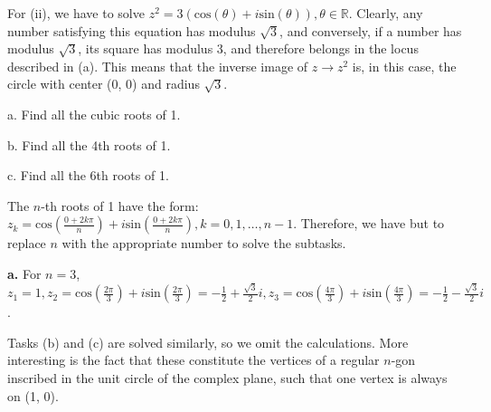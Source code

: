 \begin{solution}
    For (ii), we have to solve $z^2 = 3(\text{cos}(\theta) + i \text{sin}(\theta)), \theta \in \mathbb{R}$. Clearly, any number satisfying this equation has modulus $\sqrt{3}$, and conversely, if a number has modulus $\sqrt{3}$, its square has modulus 3, and therefore belongs in the locus described in (a). This means that the inverse image of $z \rightarrow z^2$ is, in this case, the circle with center (0, 0) and radius $\sqrt{3}$.
\end{solution}

\begin{exercise}{13}
    a. Find all the cubic roots of 1.

    b. Find all the 4th roots of 1.

    c. Find all the 6th roots of 1.
\end{exercise}

\begin{solution}

    The $n$-th roots of 1 have the form: $z_k = \text{cos}(\frac{0 + 2k\pi}{n}) + i\text{sin}(\frac{0 + 2k\pi}{n}), k = 0, 1, \ldots, n-1$. Therefore, we have but to replace $n$ with the appropriate number to solve the subtasks.

    \textbf{a.} For $n=3$, $z_1 = 1, z_2 = \text{cos}(\frac{2\pi}{3}) + i\text{sin}(\frac{2\pi}{3}) = -\frac{1}{2} + \frac{\sqrt{3}}{2}i, z_3 = \text{cos}(\frac{4\pi}{3}) + i\text{sin}(\frac{4\pi}{3}) = -\frac{1}{2} - \frac{\sqrt{3}}{2}i$.

    Tasks (b) and (c) are solved similarly, so we omit the calculations. More interesting is the fact that these constitute the vertices of a regular $n$-gon inscribed in the unit circle of the complex plane, such that one vertex is always on (1, 0).
\end{solution}


\setcounter{section}{-1} 